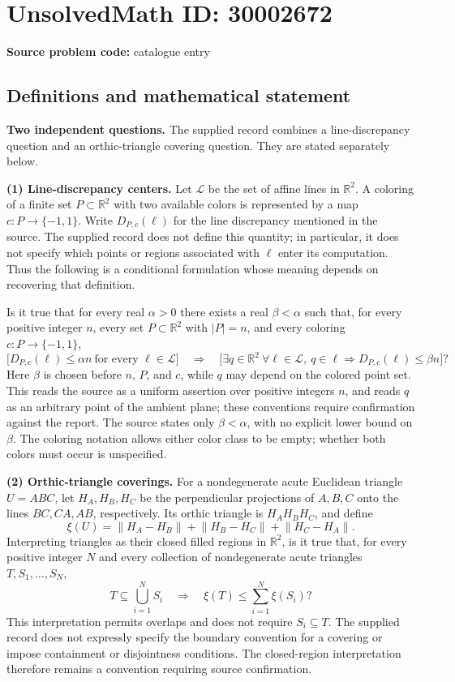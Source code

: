 \documentclass[11pt]{article}
\newcommand{\R}{\mathbb{R}}
\begin{document}
\section*{UnsolvedMath ID: 30002672}
\textbf{Source problem code:} catalogue entry
\subsection{Definitions and mathematical statement}
\textbf{Two independent questions.} The supplied record combines a line-discrepancy question and an orthic-triangle covering question. They are stated separately below.

\textbf{(1) Line-discrepancy centers.} Let \(\mathcal L\) be the set of affine lines in \(\R^2\). A coloring of a finite set \(P\subset\R^2\) with two available colors is represented by a map \(c:P\to\{-1,1\}\). Write \(D_{P,c}(\ell)\) for the line discrepancy mentioned in the source. The supplied record does not define this quantity; in particular, it does not specify which points or regions associated with \(\ell\) enter its computation. Thus the following is a conditional formulation whose meaning depends on recovering that definition.

Is it true that for every real \(\alpha>0\) there exists a real \(\beta<\alpha\) such that, for every positive integer \(n\), every set \(P\subset\R^2\) with \(|P|=n\), and every coloring \(c:P\to\{-1,1\}\),
\[
\bigl[D_{P,c}(\ell)\leq\alpha n\ \text{for every }\ell\in\mathcal L\bigr]
\quad\Longrightarrow\quad
\bigl[\exists q\in\R^2\ \forall\ell\in\mathcal L,
\ q\in\ell\Longrightarrow D_{P,c}(\ell)\leq\beta n\bigr]?
\]
Here \(\beta\) is chosen before \(n\), \(P\), and \(c\), while \(q\) may depend on the colored point set. This reads the source as a uniform assertion over positive integers \(n\), and reads \(q\) as an arbitrary point of the ambient plane; these conventions require confirmation against the report. The source states only \(\beta<\alpha\), with no explicit lower bound on \(\beta\). The coloring notation allows either color class to be empty; whether both colors must occur is unspecified.

\textbf{(2) Orthic-triangle coverings.} For a nondegenerate acute Euclidean triangle \(U=ABC\), let \(H_A,H_B,H_C\) be the perpendicular projections of \(A,B,C\) onto the lines \(BC,CA,AB\), respectively. Its orthic triangle is \(H_AH_BH_C\), and define
\[
\xi(U)=\lVert H_A-H_B\rVert+\lVert H_B-H_C\rVert+\lVert H_C-H_A\rVert.
\]
Interpreting triangles as their closed filled regions in \(\R^2\), is it true that, for every positive integer \(N\) and every collection of nondegenerate acute triangles \(T,S_1,\ldots,S_N\),
\[
T\subseteq\bigcup_{i=1}^{N}S_i
\quad\Longrightarrow\quad
\xi(T)\leq\sum_{i=1}^{N}\xi(S_i)?
\]
This interpretation permits overlaps and does not require \(S_i\subseteq T\). The supplied record does not expressly specify the boundary convention for a covering or impose containment or disjointness conditions. The closed-region interpretation therefore remains a convention requiring source confirmation.
\end{document}
